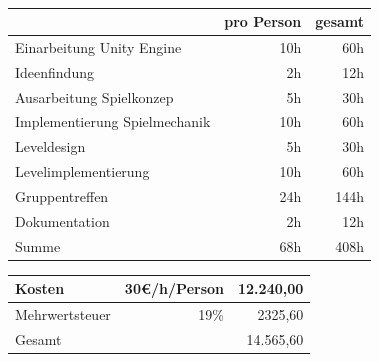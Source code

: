 \documentclass[10pt,a4paper,notitlepage]{report}
\begin{document}
	
	\\\par\medskip\Text
	\begin{center}
	\begin{tabular}{l|r|r}\hline
		 & pro Person & gesamt\\\hline
		Einarbeitung Unity Engine & 10h & 60h\\\hline
		Ideenfindung & 2h & 12h\\\hline
		Ausarbeitung Spielkonzep & 5h & 30h\\\hline
		Implementierung Spielmechanik & 10h & 60h\\\hline
		Leveldesign & 5h & 30h\\\hline
		Levelimplementierung & 10h & 60h\\\hline
		Gruppentreffen & 24h & 144h\\\hline
		Dokumentation & 2h & 12h\\\hline\hline
		Summe & 68h & 408h\\\hline
	\end{tabular}
	\par\bigskip
	\begin{tabular}{l|r|r}\hline
		Kosten & 30€/h/Person & 12.240,00\texteuro \\\hline
		Mehrwertsteuer& 19\% & 2325,60\texteuro \\\hline
		Gesamt & & 14.565,60\texteuro \\\hline
	\end{tabular}
	\end{center}\par\smallskip
	
	\clearpage
	\marginpar{\vspace{3.0mm} \color{orange}\rule{0.8mm}{53.3mm} \\[3mm] \color{hellorange}\rule{0.8mm}{170mm}}
	\par\bigskip
	
\end{document}
